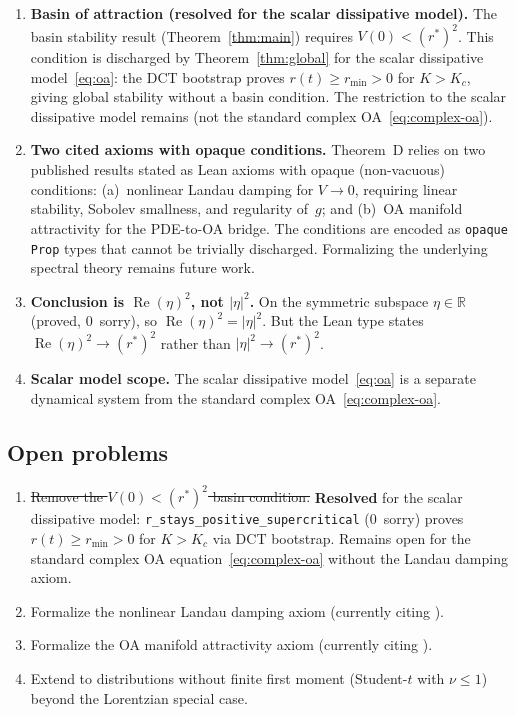 \documentclass[11pt,a4paper]{article}
\theoremstyle{definition}
\DeclareMathOperator{\re}{Re}
\newcommand{\R}{\mathbb{R}}
\begin{document}
\begin{enumerate}
\item \textbf{Basin of attraction (resolved for the scalar dissipative model).} The basin stability result (Theorem~\ref{thm:main}) requires $V(0) < (r^*)^2$. This condition is discharged by Theorem~\ref{thm:global} for the scalar dissipative model~\eqref{eq:oa}: the DCT bootstrap proves $r(t) \geq r_{\min} > 0$ for $K > K_c$, giving global stability without a basin condition. The restriction to the scalar dissipative model remains (not the standard complex OA~\eqref{eq:complex-oa}).

\item \textbf{Two cited axioms with opaque conditions.} Theorem~D relies on two published results stated as Lean axioms with opaque (non-vacuous) conditions: (a)~nonlinear Landau damping \cite{dietert2017} for $V \to 0$, requiring linear stability, Sobolev smallness, and regularity of~$g$; and (b)~OA manifold attractivity \cite{dietert-fernandez2018} for the PDE-to-OA bridge. The conditions are encoded as \texttt{opaque Prop} types that cannot be trivially discharged. Formalizing the underlying spectral theory remains future work.

\item \textbf{Conclusion is $\re(\eta)^2$, not $|\eta|^2$.} On the symmetric subspace $\eta \in \R$ (proved, 0~sorry), so $\re(\eta)^2 = |\eta|^2$. But the Lean type states $\re(\eta)^2 \to (r^*)^2$ rather than $|\eta|^2 \to (r^*)^2$.

\item \textbf{Scalar model scope.} The scalar dissipative model~\eqref{eq:oa} is a separate dynamical system from the standard complex OA~\eqref{eq:complex-oa}.
\end{enumerate}

\subsection{Open problems}

\begin{enumerate}
\item \sout{Remove the $V(0) < (r^*)^2$ basin condition.} \textbf{Resolved} for the scalar dissipative model: \texttt{r\_stays\_positive\_supercritical} (0~sorry) proves $r(t) \geq r_{\min} > 0$ for $K > K_c$ via DCT bootstrap. Remains open for the standard complex OA equation~\eqref{eq:complex-oa} without the Landau damping axiom.
\item Formalize the nonlinear Landau damping axiom (currently citing \cite{dietert2017}).
\item Formalize the OA manifold attractivity axiom (currently citing \cite{dietert-fernandez2018}).
\item Extend to distributions without finite first moment (Student-$t$ with $\nu \leq 1$) beyond the Lorentzian special case.
\end{enumerate}
\end{document}
